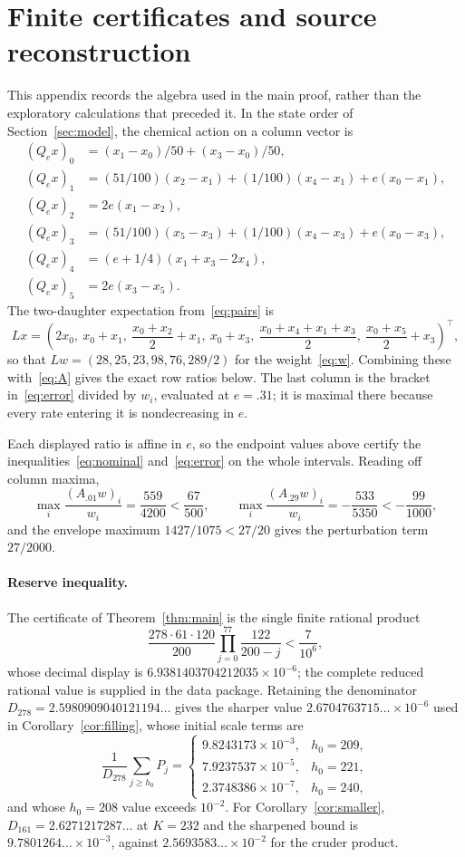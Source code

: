 \section{Finite certificates and source reconstruction}\label{app:certificates}
This appendix records the algebra used in the main proof, rather than the exploratory calculations that preceded it. In the state order of Section~\ref{sec:model}, the chemical action on a column vector is
\begin{align*}
 (Q_ex)_0&=(x_1-x_0)/50+(x_3-x_0)/50,\\
 (Q_ex)_1&=(51/100)(x_2-x_1)+(1/100)(x_4-x_1)+e(x_0-x_1),\\
 (Q_ex)_2&=2e(x_1-x_2),\\
 (Q_ex)_3&=(51/100)(x_5-x_3)+(1/100)(x_4-x_3)+e(x_0-x_3),\\
 (Q_ex)_4&=(e+1/4)(x_1+x_3-2x_4),\\
 (Q_ex)_5&=2e(x_3-x_5).
\end{align*}
The two-daughter expectation from~\eqref{eq:pairs} is
\[
 Lx=\left(2x_0,\ x_0+x_1,\ \frac{x_0+x_2}{2}+x_1,\ x_0+x_3,\
 \frac{x_0+x_4+x_1+x_3}{2},\ \frac{x_0+x_5}{2}+x_3\right)^{\!\top},
\]
so that $Lw=(28,25,23,98,76,289/2)$ for the weight~\eqref{eq:w}. Combining these with~\eqref{eq:A} gives the exact row ratios below. The last column is the bracket in~\eqref{eq:error} divided by $w_i$, evaluated at $e=.31$; it is maximal there because every rate entering it is nondecreasing in $e$.


Each displayed ratio is affine in $e$, so the endpoint values above certify the inequalities~\eqref{eq:nominal} and~\eqref{eq:error} on the whole intervals. Reading off column maxima,
\[
 \max_i\frac{(A_{.01}w)_i}{w_i}=\frac{559}{4200}<\frac{67}{500},\qquad
 \max_i\frac{(A_{.29}w)_i}{w_i}=-\frac{533}{5350}<-\frac{99}{1000},
\]
and the envelope maximum $1427/1075<27/20$ gives the perturbation term $27/2000$.

\paragraph{Reserve inequality.}
The certificate of Theorem~\ref{thm:main} is the single finite rational product
\[
 \frac{278\cdot61\cdot120}{200}\prod_{j=0}^{77}\frac{122}{200-j}<\frac7{10^6},
\]
whose decimal display is $6.9381403704212035\times10^{-6}$; the complete reduced rational value is supplied in the data package. Retaining the denominator $D_{278}=2.5980909040121194\ldots$ gives the sharper value $2.6704763715\ldots\times10^{-6}$ used in Corollary~\ref{cor:filling}, whose initial scale terms are
\[
 \frac{1}{D_{278}}\sum_{j\ge h_0}P_j=
 \begin{cases}
 9.8243173\times10^{-3},&h_0=209,\\
 7.9237537\times10^{-5},&h_0=221,\\
 2.3748386\times10^{-7},&h_0=240,
 \end{cases}
\]
and whose $h_0=208$ value exceeds $10^{-2}$. For Corollary~\ref{cor:smaller}, $D_{161}=2.6271217287\ldots$ at $K=232$ and the sharpened bound is $9.7801264\ldots\times10^{-3}$, against $2.5693583\ldots\times10^{-2}$ for the cruder product.

